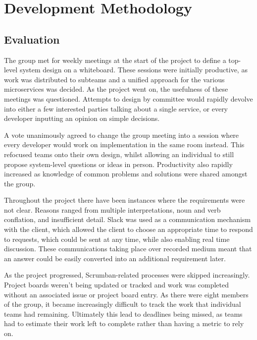 \section{Development Methodology}

  \subsection{Evaluation}
  \par
  The group met for weekly meetings at the start of the project to define a top-level system design on a whiteboard. These sessions were initially productive, as work was distributed to subteams and a unified approach for the various microservices was decided. As the project went on, the usefulness of these meetings was questioned. Attempts to design by committee would rapidly devolve into either a few interested parties talking about a single service, or every developer inputting an opinion on simple decisions.

  \par
  A vote unanimously agreed to change the group meeting into a session where every developer would work on implementation in the same room instead. This refocused teams onto their own design, whilst allowing an individual to still propose system-level questions or ideas in person. Productivity also rapidly increased as knowledge of common problems and solutions were shared amongst the group.

  \par
  Throughout the project there have been instances where the requirements were not clear. Reasons ranged from multiple interpretations, noun and verb conflation, and insufficient detail. Slack was used as a communication mechanism with the client, which allowed the client to choose an appropriate time to respond to requests, which could be sent at any time, while also enabling real time discussion. These communications taking place over recorded medium meant that an answer could be easily converted into an additional requirement later.

  \par
  As the project progressed, Scrumban-related processes were skipped increasingly. Project boards weren't being updated or tracked and work was completed without an associated issue or project board entry. As there were eight members of the group, it became increasingly difficult to track the work that individual teams had remaining. Ultimately this lead to deadlines being missed, as teams had to estimate their work left to complete rather than having a metric to rely on.

